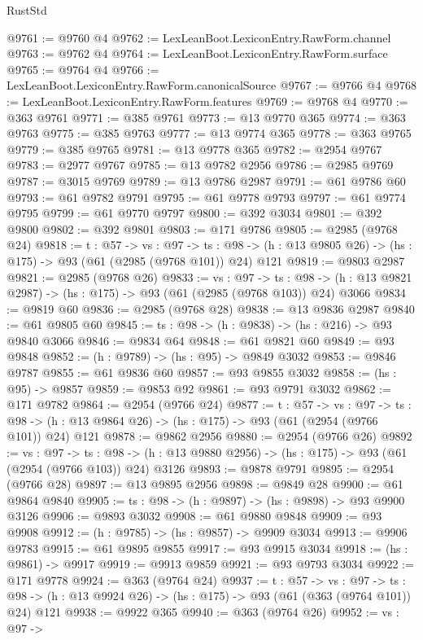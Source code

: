 \begin{lexlean}{RustStd}
\begin{coremodule}
@9761 := @9760 @4
@9762 := LexLeanBoot.LexiconEntry.RawForm.channel
@9763 := @9762 @4
@9764 := LexLeanBoot.LexiconEntry.RawForm.surface
@9765 := @9764 @4
@9766 := LexLeanBoot.LexiconEntry.RawForm.canonicalSource
@9767 := @9766 @4
@9768 := LexLeanBoot.LexiconEntry.RawForm.features
@9769 := @9768 @4
@9770 := @363 @9761
@9771 := @385 @9761
@9773 := @13 @9770 @365
@9774 := @363 @9763
@9775 := @385 @9763
@9777 := @13 @9774 @365
@9778 := @363 @9765
@9779 := @385 @9765
@9781 := @13 @9778 @365
@9782 := @2954 @9767
@9783 := @2977 @9767
@9785 := @13 @9782 @2956
@9786 := @2985 @9769
@9787 := @3015 @9769
@9789 := @13 @9786 @2987
@9791 := @61 @9786 @60
@9793 := @61 @9782 @9791
@9795 := @61 @9778 @9793
@9797 := @61 @9774 @9795
@9799 := @61 @9770 @9797
@9800 := @392 @3034
@9801 := @392 @9800
@9802 := @392 @9801
@9803 := @171 @9786
@9805 := @2985 (@9768 @24)
@9818 := {t : @57} ->
  {vs : @97} ->
  {ts : @98} -> (h : @13 @9805 @26) -> (hs : @175) -> @93 (@61 (@2985 (@9768 @101)) @24) @121
@9819 := @9803 @2987
@9821 := @2985 (@9768 @26)
@9833 := {vs : @97} ->
  {ts : @98} -> (h : @13 @9821 @2987) -> (hs : @175) -> @93 (@61 (@2985 (@9768 @103)) @24) @3066
@9834 := @9819 @60
@9836 := @2985 (@9768 @28)
@9838 := @13 @9836 @2987
@9840 := @61 @9805 @60
@9845 := {ts : @98} -> (h : @9838) -> (hs : @216) -> @93 @9840 @3066
@9846 := @9834 @64
@9848 := @61 @9821 @60
@9849 := @93 @9848
@9852 := (h : @9789) -> (hs : @95) -> @9849 @3032
@9853 := @9846 @9787
@9855 := @61 @9836 @60
@9857 := @93 @9855 @3032
@9858 := (hs : @95) -> @9857
@9859 := @9853 @92
@9861 := @93 @9791 @3032
@9862 := @171 @9782
@9864 := @2954 (@9766 @24)
@9877 := {t : @57} ->
  {vs : @97} ->
  {ts : @98} -> (h : @13 @9864 @26) -> (hs : @175) -> @93 (@61 (@2954 (@9766 @101)) @24) @121
@9878 := @9862 @2956
@9880 := @2954 (@9766 @26)
@9892 := {vs : @97} ->
  {ts : @98} -> (h : @13 @9880 @2956) -> (hs : @175) -> @93 (@61 (@2954 (@9766 @103)) @24) @3126
@9893 := @9878 @9791
@9895 := @2954 (@9766 @28)
@9897 := @13 @9895 @2956
@9898 := @9849 @28
@9900 := @61 @9864 @9840
@9905 := {ts : @98} -> (h : @9897) -> (hs : @9898) -> @93 @9900 @3126
@9906 := @9893 @3032
@9908 := @61 @9880 @9848
@9909 := @93 @9908
@9912 := (h : @9785) -> (hs : @9857) -> @9909 @3034
@9913 := @9906 @9783
@9915 := @61 @9895 @9855
@9917 := @93 @9915 @3034
@9918 := (hs : @9861) -> @9917
@9919 := @9913 @9859
@9921 := @93 @9793 @3034
@9922 := @171 @9778
@9924 := @363 (@9764 @24)
@9937 := {t : @57} ->
  {vs : @97} ->
  {ts : @98} -> (h : @13 @9924 @26) -> (hs : @175) -> @93 (@61 (@363 (@9764 @101)) @24) @121
@9938 := @9922 @365
@9940 := @363 (@9764 @26)
@9952 := {vs : @97} ->

\end{coremodule}
\end{lexlean}
